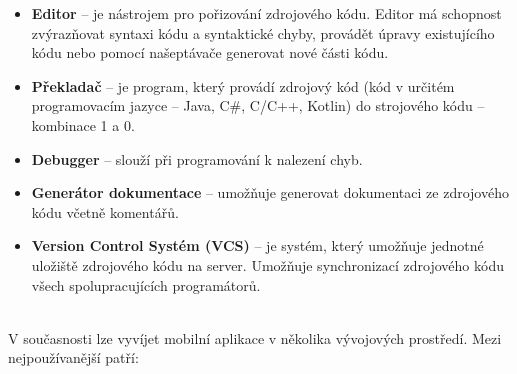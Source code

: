 \documentclass{vskpou} %
\begin{document}
\begin{itemize}
    \item \textbf{Editor} -- je nástrojem pro pořizování zdrojového kódu. Editor má schopnost zvýrazňovat syntaxi kódu a syntaktické chyby, provádět úpravy existujícího kódu nebo pomocí našeptávače generovat nové části kódu.
    \item \textbf{Překladač} -- je program, který provádí zdrojový kód (kód v určitém programovacím jazyce – Java, C\#, C/C++, Kotlin) do strojového kódu – kombinace 1 a 0.
    \item \textbf{Debugger} -- slouží při programování k nalezení chyb.
    \item \textbf{Generátor dokumentace} -- umožňuje generovat dokumentaci ze zdrojového kódu včetně komentářů.
    \item \textbf{Version Control Systém (VCS)} -- je systém, který umožňuje jednotné uložiště zdrojového kódu na server. Umožňuje synchronizací zdrojového kódu všech spolupracujících programátorů.
\end{itemize}
\\
V současnosti lze vyvíjet mobilní aplikace v několika vývojových prostředí. Mezi nejpoužívanější patří:
\end{document}
